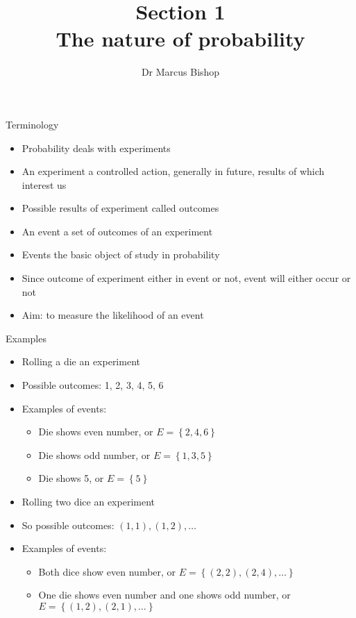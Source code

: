 \documentclass{beamer}
\title[\S1]{Section 1\\The nature of probability}
\author{Dr Marcus Bishop}
\theoremstyle{definition}
\begin{document}
\begin{frame}\titlepage\end{frame}
\LogoOff

\begin{frame}{Terminology}
\begin{itemize}
\item Probability deals with \alert{experiments}
\item An \alert{experiment} a controlled action, generally in future,
results of which interest us
\item Possible results of experiment called \alert{outcomes}
\item An \alert{event} a set of outcomes of an experiment
\item Events the basic object of study in probability
\item Since outcome of experiment either in event or not,
event will either occur or not
\item Aim: to measure the likelihood of an event
\end{itemize}
\end{frame}

\begin{frame}{Examples}
\begin{example}
\begin{itemize}
\item Rolling a die an experiment
\item Possible outcomes: 1, 2, 3, 4, 5, 6
\item Examples of events:
\begin{itemize}
\item Die shows even number, or $E=\left\{2,4,6\right\}$
\item Die shows odd number, or $E=\left\{1,3,5\right\}$
\item Die shows 5, or $E=\left\{5\right\}$
\end{itemize}
\end{itemize}
\end{example}
\begin{example}
\begin{itemize}
\item Rolling \alert{two} dice an experiment
\item So possible outcomes: $\left(1,1\right),\left(1,2\right),\ldots$
\item Examples of events:
\begin{itemize}
\item Both dice show even number, or $E=\left\{\left(2,2\right),
\left(2,4\right),\ldots\right\}$
\item One die shows even number and one shows odd number,
or $E=\left\{\left(1,2\right),\left(2,1\right),\ldots\right\}$
\end{itemize}
\end{itemize}
\end{example}
\end{frame}
\end{document}
